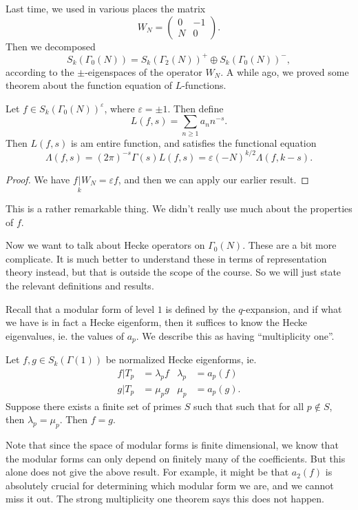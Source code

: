 \documentclass[a4paper]{article}
\begin{document}
Last time, we used in various places the matrix
\[
  W_N =
  \begin{pmatrix}
    0 & -1\\
    N & 0
  \end{pmatrix}.
\]
Then we decomposed
\[
  S_k(\Gamma_0(N)) = S_k(\Gamma_2(N))^+ \oplus S_k(\Gamma_0(N))^-,
\]
according to the $\pm$-eigenspaces of the operator $W_N$. A while ago, we proved some theorem about the function equation of $L$-functions.

\begin{thm}
  Let $f \in S_k(\Gamma_0(N))^{\varepsilon}$, where $\varepsilon = \pm 1$. Then define
  \[
    L(f, s) = \sum_{n\geq 1} a_n n^{-s}.
  \]
  Then $L(f, s)$ is am entire function, and satisfies the functional equation
  \[
    \Lambda(f, s) = (2\pi)^{-s} \Gamma(s) L(f, s) = \varepsilon (-N)^{k/2} \Lambda(f, k - s).
  \]
\end{thm}

\begin{proof}
  We have $f \underset{k}{|}W_N = \varepsilon f$, and then we can apply our earlier result. %
\end{proof}

This is a rather remarkable thing. We didn't really use much about the properties of $f$.

Now we want to talk about Hecke operators on $\Gamma_0(N)$. These are a bit more complicate. It is much better to understand these in terms of representation theory instead, but that is outside the scope of the course. So we will just state the relevant definitions and results.

Recall that a modular form of level $1$ is defined by the $q$-expansion, and if what we have is in fact a Hecke eigenform, then it suffices to know the Hecke eigenvalues, ie. the values of $a_p$. We describe this as having ``multiplicity one''.
\begin{thm}
  Let $f, g \in S_k(\Gamma(1))$ be normalized Hecke eigenforms, ie.
  \begin{align*}
    f | T_p &= \lambda_p f & \lambda_p &= a_p(f)\\
    g | T_p &= \mu_p g & \mu_p &= a_p(g).
  \end{align*}
  Suppose there exists a finite set of primes $S$ such that such that for all $p \not \in S$, then $\lambda_p = \mu_p$. Then $f = g$.
\end{thm}
Note that since the space of modular forms is finite dimensional, we know that the modular forms can only depend on finitely many of the coefficients. But this alone does not give the above result. For example, it might be that $a_2(f)$ is absolutely crucial for determining which modular form we are, and we cannot miss it out. The strong multiplicity one theorem says this does not happen.
\end{document}
